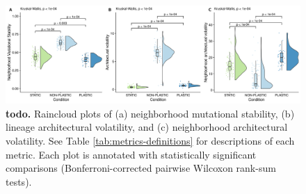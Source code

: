 \begin{figure}[h!]
    \centering
    \includegraphics[width=1\textwidth]{media/architecture/quick_architecture_panel.png}
    \caption{\small
    \textbf{todo.}
    Raincloud plots \citep{allen_raincloud_2019} of 
    (a) neighborhood mutational stability, 
    (b) lineage architectural volatility, 
    and (c) neighborhood architectural volatility. 
    See Table \ref{tab:metrics-definitions} for descriptions of each metric.
    Each plot is annotated with statistically significant comparisons (Bonferroni-corrected pairwise Wilcoxon rank-sum tests).
    }
    \label{fig:architecture-panel}
\end{figure}